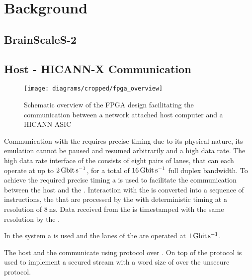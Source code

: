 \section{Background}
\subsection{BrainScaleS-2}
\subsection{Host - HICANN-X Communication}
\begin{figure}
\centerline{\texttt{[image: diagrams/cropped/fpga\_overview]}}
\caption{Schematic overview of the FPGA design facilitating the communication between a network attached host computer and a HICANN ASIC}
\end{figure}

Communication with the \ASIC{} requires precise timing due to its physical nature, its emulation cannot be paused and resumed arbitrarily and a high data rate.
The high data rate interface of the \ASIC{} consists of eight pairs of \LVDS{} lanes, that can each operate at up to $\SI{2}{\giga\bit\per\second}$, for a total of $\SI{16}{\giga\bit\per\second}$ full duplex bandwidth.
To achieve the required precise timing a \FPGA{} is used to facilitate the communication between the host and the \ASIC{}.
Interaction with the \ASIC{} is converted into a sequence of instructions, the \PlaybackProgram{} that are processed by the \FPGA{} with deterministic timing at a resolution of $\SI{8}{\nano\second}$.
Data received from the \ASIC{} is timestamped with the same resolution by the \FPGA{}.

In the \BSSTwo{} system a \Xilinx{}  \FPGA{} is used and the \LVDS{} lanes of the \ASIC{} are operated at $\SI{1}{\giga\bit\per\second}$.

The host and the \FPGA{} communicate using \UDP{} protocol over \Gigabitethernet{}. On top of \UDP{} the \HostARQ{}\autocite{ref:hostarq} protocol is used to implement a secured stream with a word size of \PhyWordSize{} over the unsecure \UDP{} protocol.

